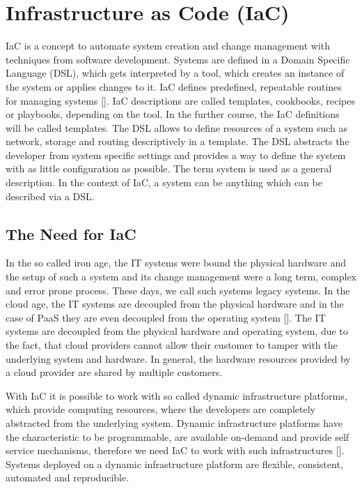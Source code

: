 \chapter{Infrastructure as Code (IaC)}
\label{cha:iac}
IaC is a concept to automate system creation and change management with techniques from software development. Systems are defined in a Domain Specific Language (DSL), which gets interpreted by a tool, which creates an instance of the system or applies changes to it. IaC defines predefined, repeatable routines for managing systems [\cite[p. 5]{Morris2016}]. IaC descriptions are called templates, cookbooks, recipes or playbooks, depending on the tool. In the further course, the IaC definitions will be called templates. The DSL allows to define resources of a system such as network, storage and routing descriptively in a template. The DSL abstracts the developer from system specific settings and provides a way to define the system with as little configuration as possible. The term system is used as a general description. In the context of IaC, a system can be anything which can be described via a DSL.

\section{The Need for IaC}
\label{sec:iac-need}
In the so called iron age, the IT systems were bound the physical hardware and the setup of such a system and its change management were a long term, complex and error prone process. These days, we call such systems legacy systems. In the cloud age, the IT systems are decoupled from the physical hardware and in the case of PaaS they are even decoupled from the operating system [\cite[p. 4]{Morris2016}]. The IT systems are decoupled from the physical hardware and operating system, due to the fact, that cloud providers cannot allow their customer to tamper with the underlying system and hardware. In general, the hardware resources provided by a cloud provider are shared by multiple customers. 

With IaC it is possible to work with so called dynamic infrastructure platforms, which provide computing resources, where the developers are completely abstracted from the underlying system. Dynamic infrastructure platforms have the characteristic to be programmable, are available on-demand and provide self service mechanisms, therefore we need IaC to work with such infrastructures  [\cite[p. 21-22]{Morris2016}]. Systems deployed on a dynamic infrastructure platform are flexible, consistent, automated and reproducible.

